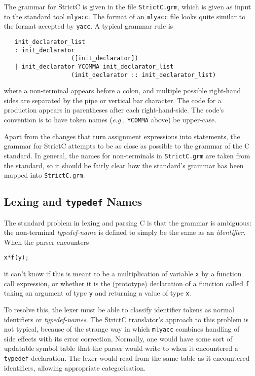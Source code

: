 \documentclass{article}
\newcommand{\strictc}{\textsf{StrictC}}
\newcommand{\srcfile}[1]{\texttt{#1}}
\newcommand{\eg}{\textit{e.g.}}
\begin{document}
The grammar for \strictc{} is given in the file \srcfile{StrictC.grm}, which
is given as input to the standard tool \texttt{mlyacc}.  The format of
an \texttt{mlyacc} file looks quite similar to the format accepted by
\texttt{yacc}.  A typical grammar rule is
\begin{verbatim}
   init_declarator_list
   : init_declarator
                   ([init_declarator])
   | init_declarator YCOMMA init_declarator_list
                   (init_declarator :: init_declarator_list)
\end{verbatim}
where a non-terminal appears before a colon, and multiple possible
right-hand sides are separated by the pipe or vertical bar character.
The code for a production appears in parentheses after each
right-hand-side.  The code's convention is to have token names (\eg,
\texttt{YCOMMA} above) be upper-case.

Apart from the changes that turn assignment expressions into
statements, the grammar for \strictc{} attempts to be as close as
possible to the grammar of the C standard.  In general, the names for
non-terminals in \srcfile{StrictC.grm} are taken from the standard, so it
should be fairly clear how the standard's grammar has been mapped into
\srcfile{StrictC.grm}.

\subsection{Lexing and \texttt{typedef} Names}
\label{sec:lexing-typedefs}

The standard problem in lexing and parsing C is that the grammar is
ambiguous: the non-terminal \textit{typedef-name} is defined to simply
be the same as an \textit{identifier}.  When the parser encounters
\begin{alltt}
   x * f(y);
\end{alltt}
it can't know if this is meant to be a multiplication of variable
\texttt{x} by a function call expression, or whether it is the
(prototype) declaration of a function called \texttt{f} taking an
argument of type \texttt{y} and returning a value of type \texttt{x}.

To resolve this, the lexer must be able to classify identifier tokens as
normal identifiers or \textit{typedef-names}.  The \strictc{}
translator's approach to this problem is not typical, because of the
strange way in which \texttt{mlyacc} combines handling of side effects
with its error correction.  Normally, one would have some sort of
updatable symbol table that the parser would write to when it
encountered a \texttt{typedef} declaration.  The lexer would read from
the same table as it encountered identifiers, allowing appropriate
categorisation.
\end{document}

